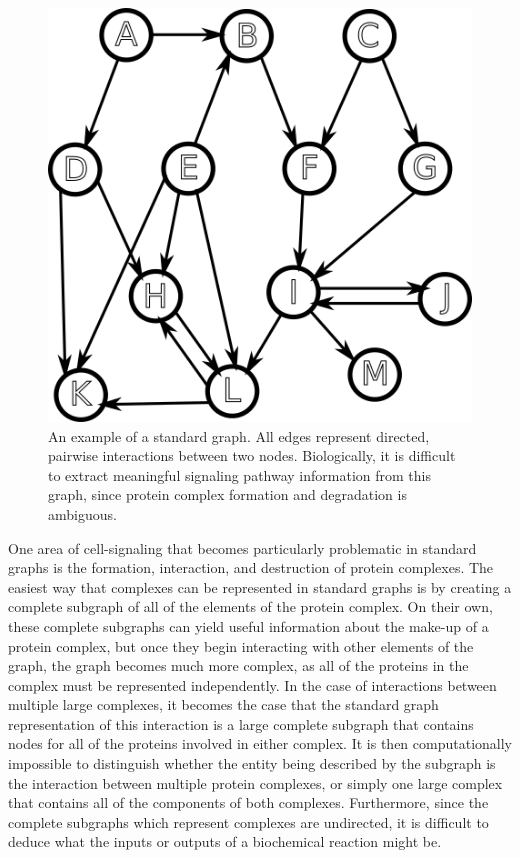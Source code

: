 \documentclass[12pt,twoside]{reedthesis}
\theoremstyle{definition}
\begin{document}
\begin{figure}[thbp]
  \begin{center}
    \includegraphics[width=\textwidth/2]{example-standard-graph}
  \caption[A standard graph]{An example of a standard graph. All edges represent directed, pairwise interactions between two nodes. Biologically, it is difficult to extract meaningful signaling pathway information from this graph, since protein complex formation and degradation is ambiguous.}
  \label{fig:example-standard-graph}
  \end{center}
\end{figure}

One area of cell-signaling that becomes particularly problematic in standard graphs is the formation, interaction, and destruction of protein complexes.  The easiest way that complexes can be represented in standard graphs is by creating a complete subgraph of all of the elements of the protein complex.  On their own, these complete subgraphs can yield useful information about the make-up of a protein complex, but once they begin interacting with other elements of the graph, the graph becomes much more complex, as all of the proteins in the complex must be represented independently.  In the case of interactions between multiple large complexes, it becomes the case that the standard graph representation of this interaction is a large complete subgraph that contains nodes for all of the proteins involved in either complex.  It is then computationally impossible to distinguish whether the entity being described by the subgraph is the interaction between multiple protein complexes, or simply one large complex that contains all of the components of both complexes.  Furthermore, since the complete subgraphs which represent complexes are undirected, it is difficult to deduce what the inputs or outputs of a biochemical reaction might be.\par
\end{document}
